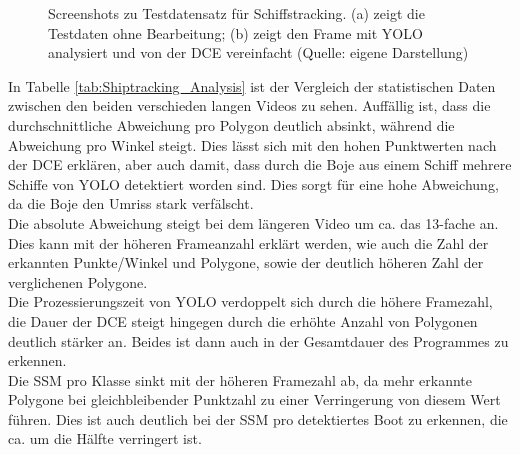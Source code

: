 {\begin{figure}[ht]
\begin{subfigure}[b]{0.45\textwidth}
		\end{subfigure}
		\caption[Screenshots zu Testdatensatz für Schiffstracking]{Screenshots zu Testdatensatz für Schiffstracking. (a) zeigt die Testdaten ohne Bearbeitung; (b) zeigt den Frame mit YOLO analysiert und von der DCE vereinfacht (Quelle: eigene Darstellung)}
		\label{Scr:Testdatensatz_Shiptracking}
	\end{figure} In Tabelle \ref{tab:Shiptracking_Analysis} ist der Vergleich der statistischen Daten zwischen den beiden verschieden langen Videos zu sehen. Auffällig ist, dass die durchschnittliche Abweichung pro Polygon deutlich absinkt, während die Abweichung pro Winkel steigt. Dies lässt sich mit den hohen Punktwerten nach der DCE erklären, aber auch damit, dass durch die Boje aus einem Schiff mehrere Schiffe von YOLO detektiert worden sind. Dies sorgt für eine hohe Abweichung, da die Boje den Umriss stark verfälscht. \\
	Die absolute Abweichung steigt bei dem längeren Video um ca. das 13-fache an. Dies kann mit der höheren Frameanzahl erklärt werden, wie auch die Zahl der erkannten Punkte/Winkel und Polygone, sowie der deutlich höheren Zahl der verglichenen Polygone. \\
	Die Prozessierungszeit von YOLO verdoppelt sich durch die höhere Framezahl, die Dauer der DCE steigt hingegen durch die erhöhte Anzahl von Polygonen deutlich stärker an. Beides ist dann auch in der Gesamtdauer des Programmes zu erkennen. \\
	Die SSM pro Klasse sinkt mit der höheren Framezahl ab, da mehr erkannte Polygone bei gleichbleibender Punktzahl zu einer Verringerung von diesem Wert führen. Dies ist auch deutlich bei der SSM pro detektiertes Boot zu erkennen, die ca. um die Hälfte verringert ist. \\

}
